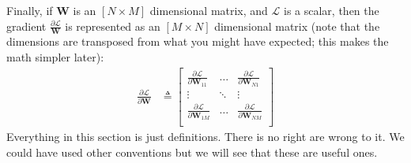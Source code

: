 Finally, if $\mathbf{W}$ is an $[N \times M]$ dimensional matrix, and $\mathcal{L}$ is a scalar, then the gradient $\frac{\partial \mathcal{L}}{\mathbf{W}}$ is represented as an $[M \times N]$ dimensional matrix (note that the dimensions are transposed from what you might have expected; this makes the math simpler later):
\begin{align}
    \frac{\partial \mathcal{L}}{\partial \mathbf{W}} & \triangleq
    \begin{bmatrix}
        \frac{\partial \mathcal{L}}{\partial \mathbf{W}_{11}} & \ldots & \frac{\partial \mathcal{L}}{\partial \mathbf{W}_{N1}} \\
        \vdots                                                & \ddots & \vdots                                                \\
        \frac{\partial \mathcal{L}}{\partial \mathbf{W}_{1M}} & \ldots & \frac{\partial \mathcal{L}}{\partial \mathbf{W}_{NM}} \\
    \end{bmatrix} \label{backprop:scalar_matrix_deriv}
\end{align}
Everything in this section is just definitions. There is no right are wrong to it. We could have used other conventions but we will see that these are useful ones.



